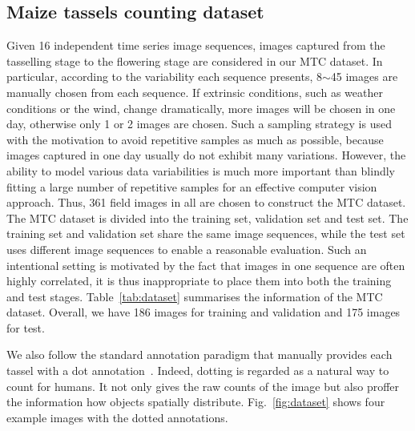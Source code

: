 \documentclass[twocolumn]{bmcart}%
\begin{document}
\subsection*{Maize tassels counting dataset}
%
Given 16 independent time series image sequences, images captured from the tasselling stage to the flowering stage are considered in our MTC dataset. In particular, according to the variability each sequence presents, 8$\sim$45 images are manually chosen from each sequence. If extrinsic conditions, such as weather conditions or the wind, change dramatically, more images will be chosen in one day, otherwise only 1 or 2 images are chosen. Such a sampling strategy is used with the motivation to avoid repetitive samples as much as possible, because images captured in one day usually do not exhibit many variations. However, the ability to model various data variabilities is much more important than blindly fitting a large number of repetitive samples for an effective computer vision approach. Thus, 361 field images in all are chosen to construct the MTC dataset. The MTC dataset is divided into the training set, validation set and test set. The training set and validation set share the same image sequences, while the test set uses different image sequences to enable a reasonable evaluation. Such an intentional setting is motivated by the fact that images in one sequence are often highly correlated, it is thus inappropriate to place them into both the training and test stages. Table~\ref{tab:dataset} summarises the information of the MTC dataset. Overall, we have 186 images for training and validation and 175 images for test.

We also follow the standard annotation paradigm that manually provides each tassel with a dot annotation~\cite{vlaz2010denlearn}. Indeed, dotting is regarded as a natural way to count for humans. It not only gives the raw counts of the image but also proffer the information how objects spatially distribute. Fig.~\ref{fig:dataset} shows four example images with the dotted annotations.
\end{document}
